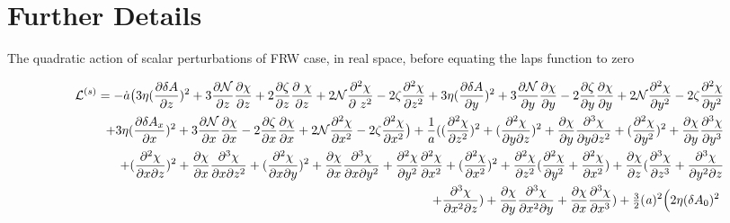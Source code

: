 \documentclass[%
 reprint,
 amsmath,amssymb,
 aps,
]{revtex4-1}
\begin{document}
\section{Further Details}
The quadratic action of scalar perturbations of FRW case, in real space, before equating the laps function to zero
\begin{widetext}
\begin{small}
\begin{eqnarray}
&&\mathcal{L}^{(s)}=- \dot{a}\bigl(3 \eta (\frac{\partial \delta A}{\partial z})^2 + 3 \frac{\partial \mathcal{N}}{\partial z} \frac{\partial \chi}{\partial z} \nonumber + 2 \frac{\partial \zeta}{\partial z} \frac{\partial \
\chi}{\partial z} + 2 \mathcal{N} \frac{\partial^{2}\chi}{\partial \
z^{2}} - 2 \zeta \frac{\partial^{2}\chi}{\partial z^{2}} \nonumber + 3 \eta (\frac{\partial \delta A}{\partial y})^2 + 3\frac{\partial \mathcal{N}}{\partial y} \frac{\partial \chi}{\partial y} - 2 \frac{\partial \zeta}{\partial y} \frac{\partial \chi}{\partial y} \nonumber + 2 \mathcal{N} \frac{\partial^{2}\chi}{\partial y^{2}} - 2 \zeta \frac{\partial^{2}\chi}{\partial y^{2}} \\
&&+ 3 \eta (\frac{\partial \delta A_x}{\partial x})^2 + 3 \frac{\partial \mathcal{N}}{\partial x} \frac{\partial \chi}{\partial x} \nonumber - 2 \frac{\partial \zeta}{\partial x} \frac{\partial \chi}{\partial x} + 2 \mathcal{N} \frac{\partial^{2}\chi}{\partial
x^{2}} - 2 \zeta \frac{\partial^{2}\chi}{\partial x^{2}}\bigr) + \frac{1}{a}((\frac{\partial^{2}\chi}{\partial z^{2}})^2 + (\frac{\partial^{2}\chi}{\partial y\partial z})^2 + \frac{\partial\chi}{\partial y}\frac{\partial^{3}\chi}{\partial y\partial z^{2}} + (\frac{\partial^{2}\chi}{\partial y^{2}})^2 + \frac{\partial \chi}{\partial y} \frac{\partial^{3}\chi}{\partial y^{3}}\\
&& + (\frac{\partial^{2}\chi}{\partial x\partial z})^2 + \frac{\partial \chi}{\partial x} \frac{\partial^{3}\chi}{\partial x\partial z^{2}} + (\frac{\partial^{2}\chi}{\partial x\partial y})^2 + \frac{\partial
\chi}{\partial x} \frac{\partial^{3}\chi}{\partial x\partial y^{2}} +
\frac{\partial^{2}\chi}{\partial y^{2}} \frac{\partial^{2}\chi}{\partial x^{2}} + (\frac{\partial^{2}\chi}{\partial x^{2}})^2 + \frac{\partial^{2}\chi}{\partial z^{2}} (\frac{\partial^{2}\chi}{\partial y^{2}} +\frac{\partial^{2}\chi}{\partial x^{2}}) + \frac{\partial \chi}{\partial z} (\frac{\partial^{3}\chi}{\partial z^{3}} + \frac{\partial^{3}\chi}{\partial y^{2}\partial z}\\
&& + \frac{\partial^{3}\chi}{\partial x^{2}\partial z}) + \frac{\partial \chi}{\partial y} \frac{\partial^{3}\chi}{\partial x^{2}\partial y} + \frac{\partial \chi}{\partial x} \frac{\partial^{3}\chi}{\partial x^{3}}) + \tfrac{3}{2} (\mathit{a})^2 \Bigl(2 \eta (\delta A_0)^2 \

\end{eqnarray}
\end{small}
\end{widetext}
\end{document}
